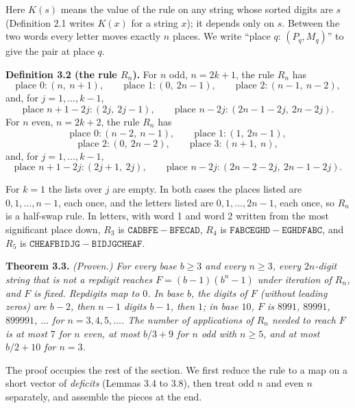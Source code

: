 \documentclass[11pt,letterpaper]{article}
\theoremstyle{paperstyle}
\theoremstyle{paperstyledef}
\theoremstyle{paperstylerem}
\begin{document}
Here \(K(s)\) means the value of the rule on any string whose sorted digits are \(s\) (Definition 2.1 writes \(K(x)\) for a string \(x\)); it depends only on \(s\). Between the two words every letter moves exactly \(n\) places. We write ``place \(q\): \((P_q, M_q)\)'' to give the pair at place \(q\).

\textbf{Definition 3.2 (the rule \(R_n\)).} For \(n\) odd, \(n = 2k+1\), the rule \(R_n\) has \[\text{place } 0: (n,\ n+1), \qquad \text{place } 1: (0,\ 2n-1), \qquad \text{place } 2: (n-1,\ n-2),\] and, for \(j = 1, \dots, k-1\), \[\text{place } n+1-2j: (2j,\ 2j-1), \qquad \text{place } n-2j: (2n-1-2j,\ 2n-2j).\] For \(n\) even, \(n = 2k+2\), the rule \(R_n\) has \[\text{place } 0: (n-2,\ n-1), \qquad \text{place } 1: (1,\ 2n-1),\] \[\text{place } 2: (0,\ 2n-2), \qquad \text{place } 3: (n+1,\ n),\] and, for \(j = 1, \dots, k-1\), \[\text{place } n+1-2j: (2j+1,\ 2j), \qquad \text{place } n-2j: (2n-2-2j,\ 2n-1-2j).\]

For \(k = 1\) the lists over \(j\) are empty. In both cases the places listed are \(0, 1, \dots, n-1\), each once, and the letters listed are \(0, 1, \dots, 2n-1\), each once, so \(R_n\) is a half-swap rule. In letters, with word 1 and word 2 written from the most significant place down, \(R_3\) is \(\mathtt{CADBFE} - \mathtt{BFECAD}\), \(R_4\) is \(\mathtt{FABCEGHD} - \mathtt{EGHDFABC}\), and \(R_5\) is \(\mathtt{CHEAFBIDJG} - \mathtt{BIDJGCHEAF}\).

\textbf{Theorem 3.3.} \emph{(Proven.) For every base \(b \geq 3\) and every \(n \geq 3\), every \(2n\)-digit string that is not a repdigit reaches \(F = (b-1)(b^n - 1)\) under iteration of \(R_n\), and \(F\) is fixed. Repdigits map to \(0\). In base \(b\), the digits of \(F\) (without leading zeros) are \(b-2\), then \(n-1\) digits \(b-1\), then \(1\); in base \(10\), \(F\) is \(8991\), \(89991\), \(899991\), \(\dots\) for \(n = 3, 4, 5, \dots\). The number of applications of \(R_n\) needed to reach \(F\) is at most \(7\) for \(n\) even, at most \(b/3 + 9\) for \(n\) odd with \(n \geq 5\), and at most \(b/2 + 10\) for \(n = 3\).}

The proof occupies the rest of the section. We first reduce the rule to a map on a short vector of \emph{deficits} (Lemmas 3.4 to 3.8), then treat odd \(n\) and even \(n\) separately, and assemble the pieces at the end.
\end{document}
